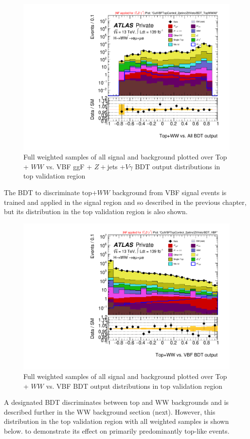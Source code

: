 \begin{figure}[!htbp]
\centering
\includegraphics[width=.6\linewidth]{Pictures/run2-emme-CutVBFTopControl_2jetinclZttVeto-BDT_TopWWAll-log.pdf}
\caption{Full weighted samples of all signal and background plotted over Top + $WW$ vs. VBF ggF + $Z+$jets +$V\gamma$ BDT output distributions in top validation region}
\label{fig:VBFTopWWBDTVR}
\end{figure}

The BDT to discriminate top$+WW$ background from VBF signal events is trained and applied in the signal region and so described in the previous chapter, but its distribution in the top validation region is also shown. 

\begin{figure}[!htbp]
\centering
\includegraphics[width=.6\linewidth]{Pictures/run2-emme-CutVBFTopControl_2jetinclZttVeto-BDT_VBF-log.pdf}
\caption{Full weighted samples of all signal and background plotted over Top + $WW$ vs. VBF BDT output distributions in top validation region}
\label{fig:VBFTopWWBDTVR}
\end{figure}

A designated BDT discriminates between top and WW backgrounds and is described further in the WW background section (next). However, this distribution in the top validation region with all weighted samples is shown below. to demonstrate its effect on primarily predominantly top-like events.

